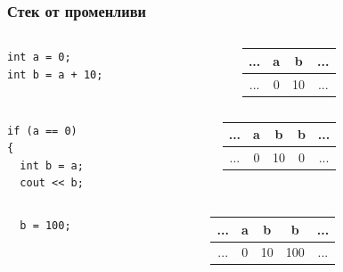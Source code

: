 \documentclass{beamer}
\begin{document}
\begin{frame}[fragile]
\frametitle{Стек от променливи}


\begin{columns}[c]
  \begin{column}{0.3\textwidth}
\begin{lstlisting}
int a = 0;
int b = a + 10;
\end{lstlisting}

  \end{column}
  \begin{column}{0.7\textwidth}
\begin{tabular}{ c | c | c | c}
\hline
... & a & b &  ...\\\hline
... & 0 & 10 & ... \\\hline
  
\end{tabular}

  \end{column}
\end{columns}

\pause

\begin{columns}[c]
  \begin{column}{0.3\textwidth}
\begin{lstlisting}
if (a == 0)
{
  int b = a;
  cout << b;
\end{lstlisting}

  \end{column}
  \begin{column}{0.7\textwidth}
\begin{tabular}{ c | c | c | c | c}
\hline
... & a & b &  \alert{b} & ...\\\hline
... & 0 & 10 & \alert {0} & ... \\\hline
  
\end{tabular}

  \end{column}
\end{columns}

\pause

\begin{columns}[c]
  \begin{column}{0.3\textwidth}
\begin{lstlisting}
  b = 100;
\end{lstlisting}

  \end{column}
  \begin{column}{0.7\textwidth}
\begin{tabular}{ c | c | c | c | c}
\hline
... & a & b & b &  ...\\\hline
... & 0 & 10& \alert{100} & ... \\\hline
  

\end{tabular}
\end{column}
\end{columns}
\end{frame}
\end{document}
